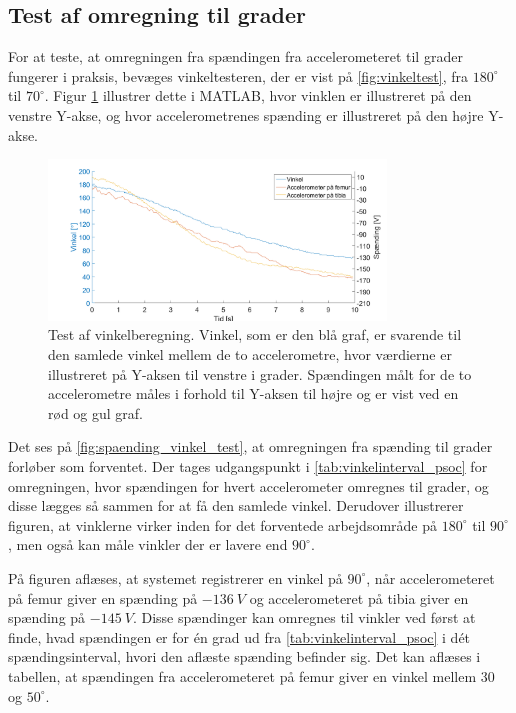 \subsection{Test af omregning til grader}

For at teste, at omregningen fra spændingen fra accelerometeret til grader fungerer i praksis, bevæges vinkeltesteren, der er vist på \autoref{fig:vinkeltest}, fra $180^{\circ}$ til $70^{\circ}$. Figur \ref{fig:spaending_vinkel_test} illustrer dette i MATLAB, hvor vinklen er illustreret på den venstre Y-akse, og hvor accelerometrenes spænding er illustreret på den højre Y-akse.

\begin{figure}[H]
\centering
\includegraphics[width=0.8\textwidth]{figures/spaending_vinkel_test}
\caption{Test af vinkelberegning. Vinkel, som er den blå graf, er svarende til den samlede vinkel mellem de to accelerometre, hvor værdierne er illustreret på Y-aksen til venstre i grader. Spændingen målt for de to accelerometre måles i forhold til Y-aksen til højre og er vist ved en rød og gul graf.}
\label{fig:spaending_vinkel_test}
\end{figure}

\noindent
Det ses på \autoref{fig:spaending_vinkel_test}, at omregningen fra spænding til grader forløber som forventet. Der tages udgangspunkt i \autoref{tab:vinkelinterval_psoc} for omregningen, hvor spændingen for hvert accelerometer omregnes til grader, og disse lægges så sammen for at få den samlede vinkel. Derudover illustrerer figuren, at vinklerne virker inden for det forventede arbejdsområde på $180^{\circ}$ til $90^{\circ}$, men også kan måle vinkler der er lavere end $90^{\circ}$.

På figuren aflæses, at systemet registrerer en vinkel på $90^{\circ}$, når  accelerometeret på femur giver en spænding på $-136~V$ og accelerometeret på tibia giver en spænding på $-145~V$. Disse spændinger kan omregnes til vinkler ved først at finde, hvad spændingen er for én grad ud fra \autoref{tab:vinkelinterval_psoc}  i dét spændingsinterval, hvori den aflæste spænding befinder sig. Det kan aflæses i tabellen, at spændingen fra accelerometeret på femur giver en vinkel mellem 30 og $50^{\circ}$.

